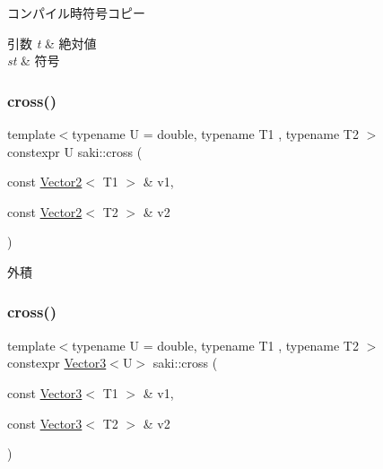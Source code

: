 コンパイル時符号コピー 


\begin{DoxyParams}{引数}
{\em t} & 絶対値 \\
\hline
{\em st} & 符号 \\
\hline
\end{DoxyParams}
\mbox{\label{namespacesaki_ab3e7c6abdd4377486e393407283a492b}} 
\subsubsection{\texorpdfstring{cross()}{cross()}\hspace{0.1cm}{\footnotesize\ttfamily [1/2]}}
{\footnotesize\ttfamily template$<$typename U  = double, typename T1 , typename T2 $>$ \\
constexpr U saki\+::cross (\begin{DoxyParamCaption}\item[{const \mbox{\hyperlink{classsaki_1_1_vector2}{Vector2}}$<$ T1 $>$ \&}]{v1,  }\item[{const \mbox{\hyperlink{classsaki_1_1_vector2}{Vector2}}$<$ T2 $>$ \&}]{v2 }\end{DoxyParamCaption})}



外積 

\mbox{\label{namespacesaki_a0292208be2262a7ecbba114ebd10d5d6}} 
\subsubsection{\texorpdfstring{cross()}{cross()}\hspace{0.1cm}{\footnotesize\ttfamily [2/2]}}
{\footnotesize\ttfamily template$<$typename U  = double, typename T1 , typename T2 $>$ \\
constexpr \mbox{\hyperlink{classsaki_1_1_vector3}{Vector3}}$<$U$>$ saki\+::cross (\begin{DoxyParamCaption}\item[{const \mbox{\hyperlink{classsaki_1_1_vector3}{Vector3}}$<$ T1 $>$ \&}]{v1,  }\item[{const \mbox{\hyperlink{classsaki_1_1_vector3}{Vector3}}$<$ T2 $>$ \&}]{v2 }\end{DoxyParamCaption})}



